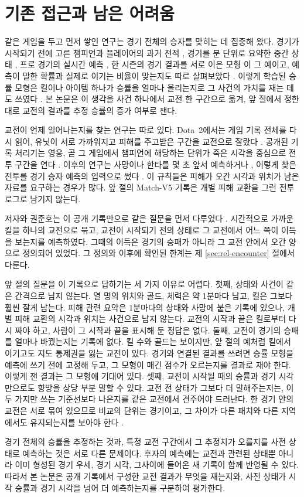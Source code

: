 \section{기존 접근과 남은 어려움}
\label{sec:intro-prior}

같은 게임을 두고 먼저 쌓인 연구는 경기 전체의 승자를 맞히는 데 집중해 왔다. 경기가 시작되기 전에 고른 챔피언과 플레이어의 과거 전적 \cite{costa2021,hitar2023}, 경기를 분 단위로 요약한 중간 상태 \cite{silva2018continuous}, 프로 경기의 실시간 예측 \cite{hodge2021win}, 한 시즌의 경기 결과를 서로 이은 모형 \cite{bisberg2022}이 그 예이고, 예측이 말한 확률과 실제로 이기는 비율이 맞는지도 따로 살펴보았다 \cite{kim2020confidence}. 이렇게 학습된 승률 모형은 킬이나 아이템 하나가 승률을 얼마나 올리는지로 그 사건의 가치를 재는 데도 쓰였다 \cite{maymin2021smart,jalovaara2024win}. 본 논문은 이 생각을 사건 하나에서 교전 한 구간으로 옮겨, 앞 절에서 정한 대로 교전의 결과를 추정 승률의 증가 여부로 잰다.

교전이 언제 일어나는지를 찾는 연구는 따로 있다. Dota~2에서는 게임 기록 전체를 다시 읽어, 유닛이 서로 가까워지고 피해를 주고받은 구간을 교전으로 잘랐다 \cite{schubert2016encounter}. 공개된 기록 처리기는 영웅, 곧 그 게임에서 챔피언에 해당하는 단위가 죽은 시각을 중심으로 전투 구간을 연다 \cite{opendota2018processteamfights}. 이후의 연구는 사망이나 한타를 몇 초 앞서 예측하거나 \cite{tot2021camera,katona2019time}, 이렇게 찾은 전투를 경기 승자 예측의 입력으로 썼다 \cite{ke2022}. 이 규칙들은 피해가 오간 시각과 위치가 남은 자료를 요구하는 경우가 많다. 앞 절의 Match-V5 기록은 개별 피해 교환을 그런 전투 로그로 남기지 않는다.

저자와 권준호는 이 공개 기록만으로 같은 질문을 먼저 다루었다 \cite{baek2026killconditioned}. 시간적으로 가까운 킬을 하나의 교전으로 묶고, 교전이 시작되기 전의 상태로 그 교전에서 어느 쪽이 이득을 보는지를 예측하였다. 그때의 이득은 경기의 승패가 아니라 그 교전 안에서 오간 양으로 정의되어 있었다. 그 정의와 이후에 확인된 한계는 제 \ref{sec:rel-encounter} 절에서 다룬다.

앞 절의 질문을 이 기록으로 답하기는 세 가지 이유로 어렵다. 첫째, 상태와 사건이 같은 간격으로 남지 않는다. 열 명의 위치와 골드, 체력은 약 1분마다 남고, 킬은 그보다 훨씬 잘게 남는다. 피해 관련 요약은 1분마다의 상태와 사망에 붙은 기록에 있으나, 개별 피해 교환의 시각과 위치는 사건으로 남지 않는다. 교전의 시작과 끝은 킬로부터 다시 짜야 하고, 사람이 그 시작과 끝을 표시해 둔 정답은 없다. 둘째, 교전이 경기의 승패를 얼마나 바꿨는지는 기록에 없다. 킬 수와 골드는 보이지만, 앞 절의 예처럼 킬에서 이기고도 지도 통제권을 잃는 교전이 있다. 경기와 연결된 결과를 쓰려면 승률 모형을 예측에 쓰기 전에 고정해 두고, 그 모형이 매긴 점수가 오르는지를 결과로 재야 한다. 이렇게 잰 결과는 그 모형에 기대어 있다. 셋째, 교전이 시작될 때의 승률과 경기 시각만으로도 향방을 상당 부분 말할 수 있다. 교전 전 상태가 그보다 더 말해주는지는, 이 두 가지만 쓰는 기준선보다 나은지를 같은 교전에서 견주어야 드러난다. 한 경기 안의 교전은 서로 묶여 있으므로 비교의 단위는 경기이고, 그 차이가 다른 패치와 다른 지역에서도 유지되는지를 보아야 한다 \cite{ChristoffersenDiebold2006,GneitingRaftery2007,CameronMiller2015}.

경기 전체의 승률을 추정하는 것과, 특정 교전 구간에서 그 추정치가 오를지를 사전 상태로 예측하는 것은 서로 다른 문제이다. 후자의 예측에는 교전과 관련된 상태뿐 아니라 이미 형성된 경기 우세, 경기 시각, 그사이에 들어온 새 기록이 함께 반영될 수 있다. 따라서 본 논문은 공개 기록에서 구성한 교전 결과가 무엇을 재는지와, 사전 상태가 시작 승률과 경기 시각을 넘어 더 예측하는지를 구분하여 평가한다.
